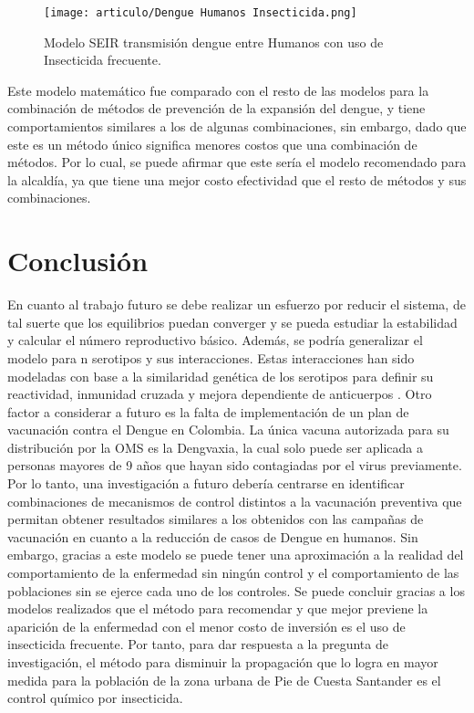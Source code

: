 \documentclass[journal]{IEEEtran}
\begin{document}
\begin{figure}[H]
    \centering
        \texttt{[image: articulo/Dengue Humanos Insecticida.png]}
        \caption{Modelo SEIR transmisión dengue entre Humanos con uso de Insecticida frecuente.}
        \label{2J}
    \centering
\end{figure}
Este modelo matemático fue comparado con el resto de las modelos para la combinación de métodos de prevención de la expansión del dengue, y tiene comportamientos similares a los de algunas combinaciones, sin embargo, dado que este es un método único significa menores costos que una combinación de métodos. Por lo cual, se puede afirmar que este sería el modelo recomendado para la alcaldía, ya que tiene una mejor costo efectividad que el resto de métodos y sus combinaciones.
\section{Conclusión}

En cuanto al trabajo futuro se debe realizar un esfuerzo por reducir el sistema, de tal suerte que los equilibrios puedan converger y se pueda estudiar la estabilidad y calcular el número reproductivo básico. Además, se podría generalizar el modelo para n serotipos y sus interacciones. Estas interacciones han sido modeladas con base a la similaridad genética de los serotipos para definir su reactividad, inmunidad cruzada y mejora dependiente de anticuerpos \cite{genetica}. Otro factor a considerar a futuro es la falta de implementación de un plan de vacunación contra el Dengue en Colombia. La única vacuna autorizada para su distribución por la OMS es la Dengvaxia, la cual solo puede ser aplicada a personas mayores de 9 años que hayan sido contagiadas por el virus previamente. \cite{mattar2019historia} Por lo tanto, una investigación a futuro debería centrarse en identificar combinaciones de mecanismos de control distintos a la vacunación preventiva que permitan obtener resultados similares a los obtenidos con las campañas de vacunación en cuanto a la reducción de casos de Dengue en humanos. 
Sin embargo, gracias a este modelo se puede tener una aproximación a la realidad del comportamiento de la enfermedad sin ningún control y el comportamiento de las poblaciones sin se ejerce cada uno de los controles. Se puede concluir gracias a los modelos realizados que el método para recomendar y que mejor previene la aparición de la enfermedad con el menor costo de inversión es el uso de insecticida frecuente. Por tanto, para dar respuesta a la pregunta de investigación, el método para disminuir la propagación que lo logra en mayor medida para la población de la zona urbana de Pie de Cuesta Santander es el control químico por insecticida.
\end{document}

